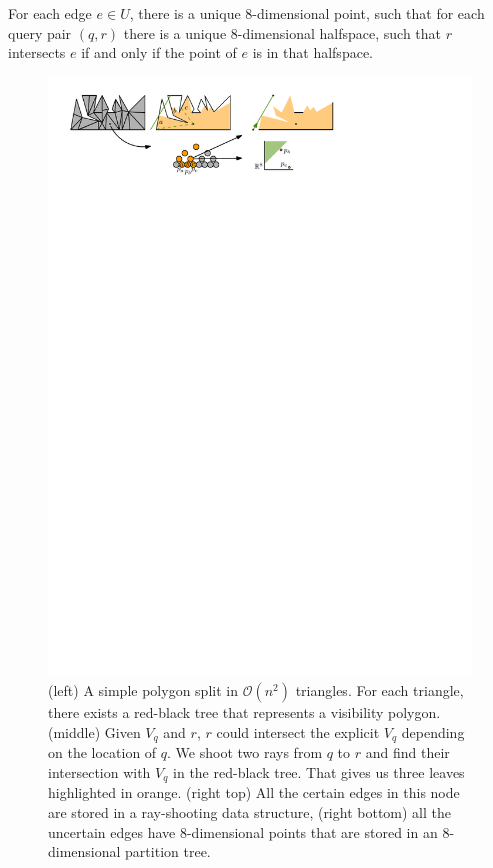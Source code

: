\documentclass[a4paper, UKenglish]{lipics-v2018}
\begin{document}
\begin{lemma}
\label{lemma:uncertain_intersection}
For each edge $e \in U$, there is a unique 8-dimensional point, such that for each query pair $(q, r)$ there is a unique $8$-dimensional halfspace, such that $r$ intersects $e$ if and only if the point of $e$ is in that halfspace.
\end{lemma}



\begin{figure}[h]
    \centering
    \includegraphics[]{../twolevel}
    \caption{ (left) A simple polygon split in $\mathcal{O}(n^2)$ triangles. For each triangle, there exists a red-black tree that represents a visibility polygon. (middle) Given $V_q$ and $r$, $r$ could intersect the explicit $V_q$ depending on the location of $q$. We shoot two rays from $q$ to $r$ and find their intersection with $V_q$ in the red-black tree. That gives us three leaves highlighted in orange. (right top) All the certain edges in this node are stored in a ray-shooting data structure, (right bottom) all the uncertain edges have 8-dimensional points that are stored in an $8$-dimensional partition tree.}
    \label{fig:twolevel}
\end{figure}
\end{document}
